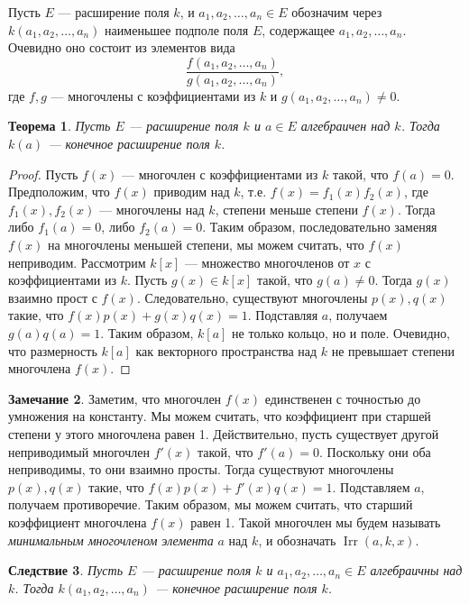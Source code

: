 \documentclass[12pt, titlepage, oneside]{amsbook}
\newcommand{\Irr}{\operatorname{Irr}}
\newtheorem{theorem}{Теорема}[chapter]
\newtheorem{corollary}[theorem]{Следствие}
\theoremstyle{definition}
\newtheorem{remark}[theorem]{Замечание}
\theoremstyle{remark}
\begin{document}
Пусть $E$ --- расширение поля $k$, и $a_1,a_2,\ldots, a_n\in E$ обозначим через $k(a_1,a_2,\ldots, a_n)$ наименьшее подполе поля $E$, содержащее $a_1,a_2,\ldots,a_n$. Очевидно оно состоит из элементов вида $$\frac{f(a_1,a_2,\ldots,a_n)}{g(a_1,a_2,\ldots,a_n)},$$ где $f,g$ --- многочлены с коэффициентами из $k$ и $g(a_1,a_2,\ldots,a_n)\neq 0$.

\begin{theorem}
	\label{Ras3} Пусть $E$ --- расширение поля $k$ и $a\in E$ алгебраичен над $k$. Тогда $k(a)$ --- конечное расширение поля $k$.
\end{theorem}

\begin{proof}
	Пусть $f(x)$ --- многочлен с коэффициентами из $k$ такой, что $f(a)=0$. Предположим, что $f(x)$ приводим над $k$, т.е. $f(x)=f_1(x)f_2(x)$, где $f_1(x),f_2(x)$ --- многочлены над $k$, степени меньше степени $f(x)$. Тогда либо $f_1(a)=0$, либо $f_2(a)=0$. Таким образом, последовательно заменяя $f(x)$ на многочлены меньшей степени, мы можем считать, что $f(x)$ неприводим. Рассмотрим $k[x]$ --- множество многочленов от $x$ с коэффициентами из $k$. Пусть $g(x)\in k[x]$ такой, что $g(a)\neq 0$. Тогда $g(x)$ взаимно прост с $f(x)$. Следовательно, существуют многочлены $p(x), q(x)$ такие, что $f(x)p(x)+g(x)q(x)=1$. Подставляя $a$, получаем $g(a)q(a)=1$. Таким образом, $k[a]$ не только кольцо, но и поле. Очевидно, что размерность $k[a]$ как векторного пространства над $k$ не превышает степени многочлена $f(x)$.
\end{proof}

\begin{remark}
	Заметим, что многочлен $f(x)$ единственен с точностью до умножения на константу. Мы можем считать, что коэффициент при старшей степени у этого многочлена равен 1. Действительно, пусть существует другой неприводимый многочлен $f'(x)$ такой, что $f'(a)=0$. Поскольку они оба неприводимы, то они взаимно просты. Тогда существуют многочлены $p(x), q(x)$ такие, что $f(x)p(x)+f'(x)q(x)=1$. Подставляем $a$, получаем противоречие. Таким образом, мы можем считать, что старший коэффициент многочлена $f(x)$ равен 1. Такой многочлен мы будем называть \emph{минимальным многочленом элемента} $a$ над $k$, и обозначать $\Irr(a,k,x)$.
\end{remark}

\begin{corollary}
	\label{Ras4}
	Пусть $E$ --- расширение поля $k$ и $a_1,a_2,\ldots,a_n\in E$ алгебраичны над $k$. Тогда $k(a_1,a_2,\ldots,a_n)$ --- конечное расширение поля $k$.
\end{corollary}
\end{document}
